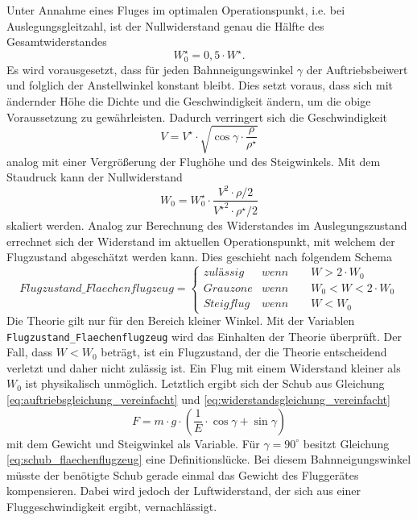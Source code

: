 Unter Annahme eines Fluges im optimalen Operationspunkt, i.e. bei Auslegungsgleitzahl, ist der Nullwiderstand genau die Hälfte des Gesamtwiderstandes
\begin{equation}
	W_0^\star = 0,5\cdot W^\star .
\end{equation}
Es wird vorausgesetzt, dass für jeden Bahnneigungswinkel \ensuremath{\gamma} der Auftriebsbeiwert und folglich der Anstellwinkel konstant bleibt. Dies setzt voraus, dass sich mit ändernder Höhe die Dichte und die Geschwindigkeit ändern, um die obige Voraussetzung zu gewährleisten. Dadurch verringert sich die Geschwindigkeit
\begin{equation}
	V = V^\star\cdot\sqrt{\cos\gamma\cdot\frac{\rho}{\rho^\star}}  \label{eq:geschw_flaechenflugzeug}
\end{equation}
analog mit einer Vergrößerung der Flughöhe und des Steigwinkels. Mit dem Staudruck kann der Nullwiderstand 
\begin{equation}
	W_0 = W_0^\star\cdot\frac{V^2\cdot\rho/2}{{V^\star}^2\cdot\rho^\star/2}
\end{equation}
skaliert werden.
Analog zur Berechnung des Widerstandes im Auslegungszustand errechnet sich der Widerstand im aktuellen Operationspunkt, mit welchem der Flugzustand abgeschätzt werden kann. Dies geschieht nach folgendem Schema
\begin{equation}
Flugzustand\_Flaechenflugzeug = \begin{cases} 
zulässig & wenn \qquad W > 2\cdot W_0 \\ 
Grauzone & wenn \qquad W_0 < W < 2\cdot W_0 \\ 
Steigflug & wenn \qquad W < W_0 
\end{cases}
\end{equation} 
Die Theorie gilt nur für den Bereich kleiner Winkel. Mit der Variablen \texttt{Flugzustand\_Flaechenflugzeug} wird das Einhalten der Theorie überprüft. Der Fall, dass \ensuremath{W < W_0} beträgt, ist ein Flugzustand, der die Theorie entscheidend verletzt und daher nicht zulässig ist. Ein Flug mit einem Widerstand kleiner als \ensuremath{W_0} ist physikalisch unmöglich.
Letztlich ergibt sich der Schub aus Gleichung \ref{eq:auftriebsgleichung_vereinfacht} und \ref{eq:widerstandsgleichung_vereinfacht}
\begin{equation}
	F = m\cdot g\cdot (\frac{1}{E}\cdot\cos\gamma + \sin\gamma) \label{eq:schub_flaechenflugzeug}
\end{equation}
mit dem Gewicht und Steigwinkel als Variable.
Für \ensuremath{\gamma = 90^\circ} besitzt Gleichung \ref{eq:schub_flaechenflugzeug} eine Definitionslücke. Bei diesem Bahnneigungswinkel müsste der benötigte Schub gerade einmal das Gewicht des Fluggerätes kompensieren. Dabei wird jedoch der Luftwiderstand, der sich aus einer Fluggeschwindigkeit ergibt, vernachlässigt. 

